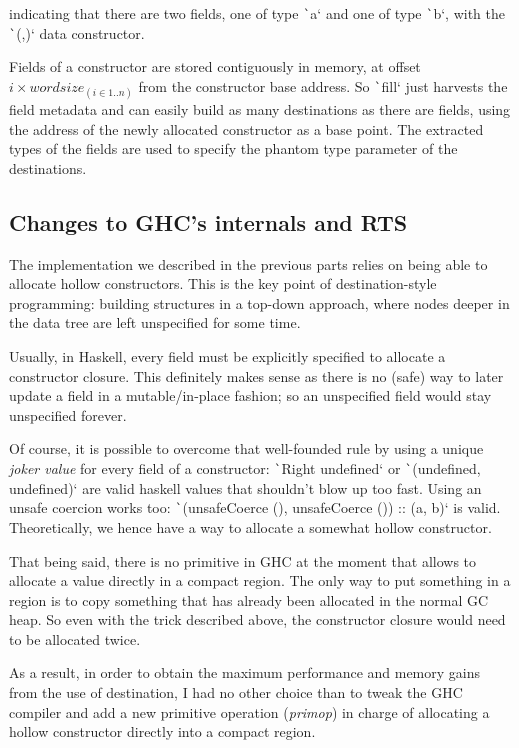 \documentclass[english]{jflart}
\begin{document}
indicating that there are two fields, one of type \texttt`a` and one of type \texttt`b`, with the \texttt`(,)` data constructor.

Fields of a constructor are stored contiguously in memory, at offset $i \times \textit{wordsize}_{(i \in 1..n)}$ from the constructor base address. So \texttt`fill` just harvests the field metadata and can easily build as many destinations as there are fields, using the address of the newly allocated constructor as a base point. The extracted types of the fields are used to specify the phantom type parameter of the destinations.

\subsection{Changes to GHC's internals and RTS}

The implementation we described in the previous parts relies on being able to allocate hollow constructors. This is the key point of destination-style programming: building structures in a top-down approach, where nodes deeper in the data tree are left unspecified for some time.

Usually, in Haskell, every field must be explicitly specified to allocate a constructor closure. This definitely makes sense as there is no (safe) way to later update a field in a mutable/in-place fashion; so an unspecified field would stay unspecified forever.

Of course, it is possible to overcome that well-founded rule by using a unique \emph{joker value} for every field of a constructor: \texttt`Right undefined` or \texttt`(undefined, undefined)` are valid haskell values that shouldn't blow up too fast. Using an unsafe coercion works too: \texttt`(unsafeCoerce (), unsafeCoerce ()) :: (a, b)` is valid. Theoretically, we hence have a way to allocate a somewhat hollow constructor.

That being said, there is no primitive in GHC at the moment that allows to allocate a value directly in a compact region. The only way to put something in a region is to copy something that has already been allocated in the normal GC heap. So even with the trick described above, the constructor closure would need to be allocated twice.

As a result, in order to obtain the maximum performance and memory gains from the use of destination, I had no other choice than to tweak the GHC compiler and add a new primitive operation (\emph{primop}) in charge of allocating a hollow constructor directly into a compact region.
\end{document}
